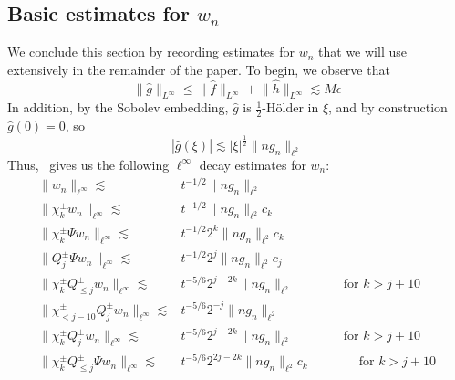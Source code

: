 \documentclass[letterpaper, reqno,final]{amsart}
\begin{document}
\subsection{Basic estimates for \texorpdfstring{$w_n$}{w\_n}}

We conclude this section by recording estimates for $w_n$ that we will use extensively in the remainder of the paper.  To begin, we observe that 
\begin{equation*}
    \lVert \hat{g} \rVert_{L^\infty} \leq \lVert \hat{f} \rVert_{L^\infty} + \lVert \hat{h} \rVert_{L^\infty} \lesssim M\epsilon
\end{equation*}
In addition, by the Sobolev embedding, $\hat{g}$ is $\frac{1}{2}$-H\"older in $\xi$, and by construction $\hat{g}(0) = 0$, so
\begin{equation}\label{eqn:hat-g-Holder}
    |\hat{g}(\xi)| \lesssim |\xi|^{\frac{1}{2}} \lVert n g_n \rVert_{\ell^2}
\end{equation}
Thus,~ gives us the following $\ell^\infty$ decay estimates for $w_n$:
\begin{equation}\label{eqn:w-ellinf-al}\begin{split}
    \lVert w_n \rVert_{\ell^\infty} \lesssim& t^{-1/2} \lVert n g_n \rVert_{\ell^2}\\
    \lVert \chi^\pm_k w_n \rVert_{\ell^\infty} \lesssim& t^{-1/2} \lVert n g_n \rVert_{\ell^2} c_k\\ 
    \lVert \chi^\pm_k \Psi w_n \rVert_{\ell^\infty} \lesssim& t^{-1/2} 2^k \lVert n g_n \rVert_{\ell^2} c_k\\ 
    \lVert Q^\pm_j \Psi w_n \rVert_{\ell^\infty} \lesssim& t^{-1/2} 2^j \lVert ng_n \rVert_{\ell^2} c_j\\ 
    \lVert \chi_k^\pm Q_{\leq j}^\pm w_n \rVert_{\ell^\infty} \lesssim& t^{-5/6} 2^{j - 2k} \lVert ng_n \rVert_{\ell^2}\qquad\qquad  \text{for } k > j + 10\\
    \lVert \chi_{< j - 10}^\pm Q_{j}^\pm w_n \rVert_{\ell^\infty} \lesssim& t^{-5/6} 2^{-j} \lVert ng_n \rVert_{\ell^2}\\
    \lVert \chi_k^\pm Q_{j}^\pm w_n \rVert_{\ell^\infty} \lesssim& t^{-5/6} 2^{j - 2k} \lVert ng_n \rVert_{\ell^2}\qquad\qquad  \text{for } k > j + 10\\
    \lVert \chi_k^\pm Q_{\leq j}^\pm \Psi w_n \rVert_{\ell^\infty} \lesssim& t^{-5/6} 2^{2j - 2k} \lVert ng_n \rVert_{\ell^2}c_k \qquad\qquad \text{for } k > j + 10
\end{split}\end{equation}
\end{document}
